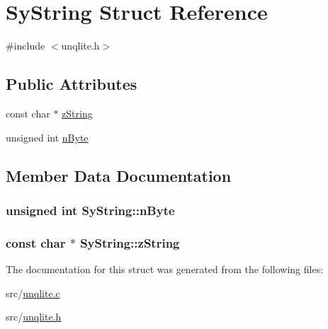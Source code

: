 \hypertarget{struct_sy_string}{\section{Sy\-String Struct Reference}
\label{d1/dd8/struct_sy_string}
}


{\ttfamily \#include $<$unqlite.\-h$>$}

\subsection*{Public Attributes}
\begin{DoxyCompactItemize}
\item 
const char $\ast$ \hyperlink{struct_sy_string_a7ba245bd72a4bb6611cc79a66dfa8c82}{z\-String}
\item 
unsigned int \hyperlink{struct_sy_string_a66a541448d6d81c7d48ed93df99d25d4}{n\-Byte}
\end{DoxyCompactItemize}


\subsection{Member Data Documentation}
\hypertarget{struct_sy_string_a66a541448d6d81c7d48ed93df99d25d4}{
\subsubsection[{n\-Byte}]{\setlength{\rightskip}{0pt plus 5cm}unsigned int Sy\-String\-::n\-Byte}}\label{d1/dd8/struct_sy_string_a66a541448d6d81c7d48ed93df99d25d4}
\hypertarget{struct_sy_string_a7ba245bd72a4bb6611cc79a66dfa8c82}{
\subsubsection[{z\-String}]{\setlength{\rightskip}{0pt plus 5cm}const char $\ast$ Sy\-String\-::z\-String}}\label{d1/dd8/struct_sy_string_a7ba245bd72a4bb6611cc79a66dfa8c82}


The documentation for this struct was generated from the following files\-:\begin{DoxyCompactItemize}
\item 
src/\hyperlink{unqlite_8c}{unqlite.\-c}\item 
src/\hyperlink{unqlite_8h}{unqlite.\-h}\end{DoxyCompactItemize}
